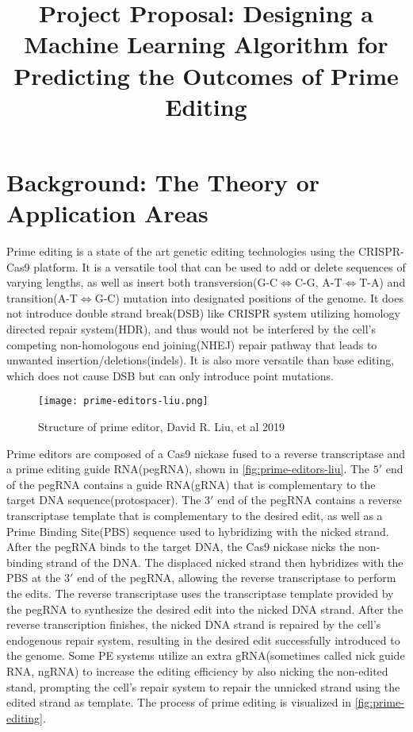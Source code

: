\documentclass[12pt]{article}
\title{Project Proposal: Designing a Machine Learning Algorithm for Predicting the Outcomes of Prime Editing}
\begin{document}
\maketitle

\section{Background: The Theory or Application Areas}

Prime editing is a state of the art genetic editing technologies using the CRISPR-Cas9 platform. It is a versatile tool that can be used to add or delete sequences of varying lengths, as well as insert both transversion(G-C$\iff$C-G, A-T$\iff$T-A) and transition(A-T$\iff$G-C) mutation into designated positions of the genome. It does not introduce double strand break(DSB) like CRISPR system utilizing homology directed repair system(HDR), and thus would not be interfered by the cell's competing non-homologous end joining(NHEJ) repair pathway that leads to unwanted insertion/deletions(indels). It is also more versatile than base editing, which does not cause DSB but can only introduce point mutations\cite{liuPrimeEditingPrecise2023}.

\begin{figure}[ht]
    \centering
    \texttt{[image: prime-editors-liu.png]}
    \caption{Structure of prime editor, David R. Liu, et al 2019}
    \label{fig:prime-editors-liu}
\end{figure}

Prime editors are composed of a Cas9 nickase fused to a reverse transcriptase and a prime editing guide RNA(pegRNA), shown in \autoref{fig:prime-editors-liu}. The $5'$ end of the pegRNA contains a guide RNA(gRNA) that is complementary to the target DNA sequence(protospacer). The $3'$ end of the pegRNA contains a reverse transcriptase template that is complementary to the desired edit, as well as a Prime Binding Site(PBS) sequence used to hybridizing with the nicked strand. After the pegRNA binds to the target DNA, the Cas9 nickase nicks the non-binding strand of the DNA. The displaced nicked strand then hybridizes with the PBS at the $3'$ end of the pegRNA, allowing the reverse transcriptase to perform the edits. The reverse transcriptase uses the transcriptase template provided by the pegRNA to synthesize the desired edit into the nicked DNA strand. After the reverse transcription finishes, the nicked DNA strand is repaired by the cell's endogenous repair system, resulting in the desired edit successfully introduced to the genome\cite{liudavidr.SearchandreplaceGenomeEditing2019}. Some PE systems utilize an extra gRNA(sometimes called nick guide RNA, ngRNA) to increase the editing efficiency by also nicking the non-edited stand, prompting the cell's repair system to repair the unnicked strand using the edited strand as template\cite{liudavidr.SearchandreplaceGenomeEditing2019}. The process of prime editing is visualized in \autoref{fig:prime-editing}.
\end{document}
